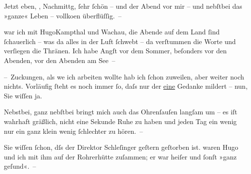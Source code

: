 \pstart
           Jetzt eben, \label{K_L00921-3v}\label{K_L00921-3}, Nachmittg, ſehr ſchön
               – und der Abend vor mir – und nebſtbei das »ganze« Leben – vollko{\geminationm}en {\pb}überflüſſig. –\pend
           
\pstart
           \label{K_L00921-4v}\label{K_L00921-4} war ich mit HugoKampthal und Wachau, die Abende auf dem Land ſind ſchauerlich – was da alles in der Luft
               ſchwebt – da verſtummen die Worte und verſiegen die Thränen. Ich habe Angſt vor dem
               Sommer, beſonders vor den Abenden, vor den Abenden am See –\pend
           
\pstart
           – Zuckungen, als we{\geminationn} ich {\pb}arbeiten wollte hab ich ſchon zuweilen, aber weiter noch nichts. Vorläufig ſteht es
               noch immer ſo, daſs nur der \uline{eine} Gedanke mildert –
               nun, Sie wiſſen ja.\pend
           
\pstart
           Nebstbei, ganz nebſtbei bringt mich auch das Ohrenſauſen langſam um – es iſt wahrhaft
               gräßlich, nicht eine Sekunde Ruhe zu haben und jeden Tag ein wenig nur {\pb}ein ganz klein wenig ſchlechter zu hören. –\pend
           
\pstart
           Sie wiſſen ſchon, dſs der Direktor Schleſinger
               geſtern geſtorben ist. \label{K_L00921-5v}\label{K_L00921-5} waren Hugo und ich mit ihm auf der Rohrerhütte zuſammen; er war heiſer und ſonſt »ganz
               geſund«. –\pend
           
